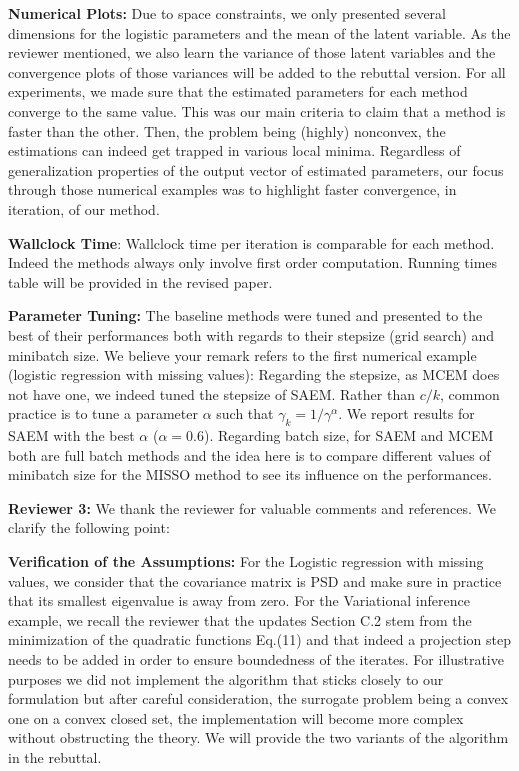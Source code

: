 \documentclass{article}
\begin{document}
\textbf{Numerical Plots:} Due to space constraints, we only presented several dimensions for the logistic parameters and the mean of the latent variable. 
As the reviewer mentioned, we also learn the variance of those latent variables and the convergence plots of those variances will be added to the rebuttal version.
For all experiments, we made sure that the estimated parameters for each method converge to the same value. 
This was our main criteria to claim that a method is faster than the other. 
Then, the problem being (highly) nonconvex, the estimations can indeed get trapped in various local minima. 
Regardless of generalization properties of the output vector of estimated parameters, our focus through those numerical examples was to highlight faster convergence, in iteration, of our method.

\textbf{Wallclock Time}:
Wallclock time per iteration is comparable for each method. Indeed the methods always only involve first order computation. 
Running times table will be provided in the revised paper.


\textbf{Parameter Tuning:}
The baseline methods were tuned and presented to the best of their performances both with regards to their stepsize (grid search) and minibatch size.
We believe your remark refers to the first numerical example (logistic regression with missing values): Regarding the stepsize, as MCEM does not have one, we indeed tuned the stepsize of SAEM. Rather than $c/k$, common practice is to tune a parameter $\alpha$ such that $\gamma_k = 1/\gamma^{\alpha}$. We report results for SAEM with the best $\alpha$ ($\alpha = 0.6$). Regarding batch size, for SAEM and MCEM both are full batch methods and the idea here is to compare different values of minibatch size for the MISSO method to see its influence on the performances.\vspace{-0.05in}



\textbf{\textcolor{yellow!80!black}{Reviewer 3:}} We thank the reviewer for valuable comments and references. We clarify the following point:

\textbf{Verification of the Assumptions:} 
For the Logistic regression with missing values, we consider that the covariance matrix is PSD and make sure in practice that its smallest eigenvalue is away from zero.
For the Variational inference example, we recall the reviewer that the updates Section C.2 stem from the minimization of the quadratic functions Eq.(11) and that indeed a projection step needs to be added in order to ensure boundedness of the iterates. 
For illustrative purposes we did not implement the algorithm that sticks closely to our formulation but after careful consideration, the surrogate problem being a convex one on a convex closed set, the implementation will become more complex without obstructing the theory. 
We will provide the two variants of the algorithm in the rebuttal. \vspace{-0.05in}
\end{document}
